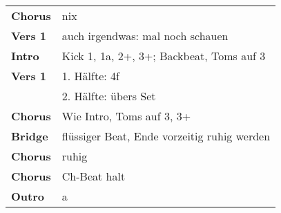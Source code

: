 
\begin{tabular}{p{1.6cm}l}
	\textbf{Chorus} & nix                                         \\
	\textbf{Vers 1} & auch irgendwas: mal noch schauen            \\
	\textbf{Intro}  & Kick 1, 1a, 2+, 3+; Backbeat, Toms auf 3    \\
	\textbf{Vers 1} & 1. Hälfte: 4f                               \\
	                & 2. Hälfte: übers Set                        \\
	\textbf{Chorus} & Wie Intro, Toms auf 3, 3+                   \\
	\textbf{Bridge} & flüssiger Beat, Ende vorzeitig ruhig werden \\
	\textbf{Chorus} & ruhig                                       \\
	\textbf{Chorus} & Ch-Beat halt                                \\
	\textbf{Outro}  & a                                           \\
\end{tabular}
